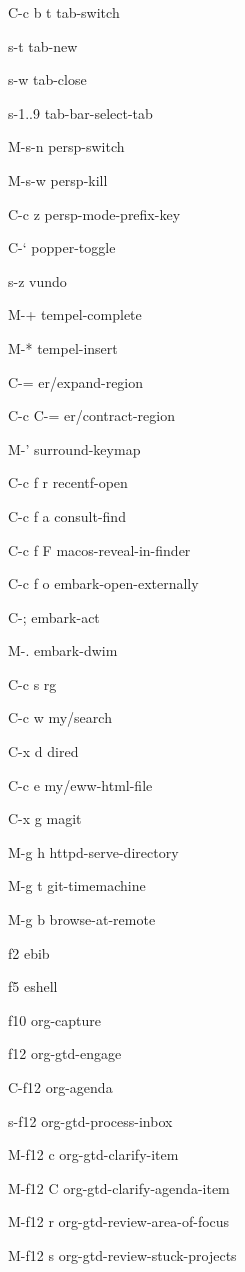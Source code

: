 \documentclass[10pt]{article}
\begin{document}
\begin{multicols}{4}
\begin{keylist}
  \item[C-c b t] tab-switch
  \item[s-t] tab-new
  \item[s-w] tab-close
  \item[s-1..9] tab-bar-select-tab

  \item[M-s-n] persp-switch
  \item[M-s-w] persp-kill
  \item[C-c z] persp-mode-prefix-key

  \item[C-`] popper-toggle

  \item[s-z] vundo

  \item[M-+] tempel-complete
  \item[M-*] tempel-insert

  \item[C-=] er/expand-region
  \item[C-c C-=] er/contract-region

  \item[M-'] surround-keymap

  \item[C-c f r] recentf-open
  \item[C-c f a] consult-find
  \item[C-c f F] macos-reveal-in-finder
  \item[C-c f o] embark-open-externally

  \item[C-;] embark-act
  \item[M-.] embark-dwim

  \item[C-c s] rg
  \item[C-c w] my/search

  \item[C-x d] dired
  \item[C-c e] my/eww-html-file

  \item[C-x g] magit
  \item[M-g h] httpd-serve-directory
  \item[M-g t] git-timemachine
  \item[M-g b] browse-at-remote

  \item[f2] ebib
  \item[f5] eshell
  \item[f10] org-capture
  \item[f12] org-gtd-engage
  \item[C-f12] org-agenda
  \item[s-f12] org-gtd-process-inbox
  \item[M-f12 c] org-gtd-clarify-item
  \item[M-f12 C] org-gtd-clarify-agenda-item
  \item[M-f12 r] org-gtd-review-area-of-focus
  \item[M-f12 s] org-gtd-review-stuck-projects


\end{keylist}
\end{multicols}
\end{document}
